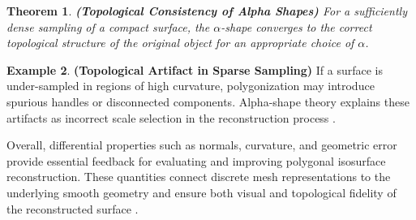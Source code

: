 \documentclass[12pt, a4paper, oneside]{book}
\theoremstyle{plain}
\newtheorem{theorem}{Theorem}[chapter]
\theoremstyle{definition}
\newtheorem{example}[theorem]{Example}
\theoremstyle{remark}
\theoremstyle{definition}
\begin{document}
\begin{theorem}
    \textbf{(Topological Consistency of Alpha Shapes)}
For a sufficiently dense sampling of a compact surface, the $\alpha$-shape converges to the correct topological structure of the original object for an appropriate choice of $\alpha$.
\end{theorem}

\vspace{0.5em}

\begin{example}
    \textbf{(Topological Artifact in Sparse Sampling)}
If a surface is under-sampled in regions of high curvature, polygonization may introduce spurious handles or disconnected components. Alpha-shape theory explains these artifacts as incorrect scale selection in the reconstruction process \cite{edelsbrunner1994three}.
\end{example}


\vspace{0.5em}

Overall, differential properties such as normals, curvature, and geometric error provide essential feedback for evaluating and improving polygonal isosurface reconstruction. These quantities connect discrete mesh representations to the underlying smooth geometry and ensure both visual and topological fidelity of the reconstructed surface \cite{rusinkiewicz2004estimating,taubin1995curvature,cignoni1998metro,garland1997quadric,edelsbrunner1994three}.

%
% 
%

\newpage


\end{document}
